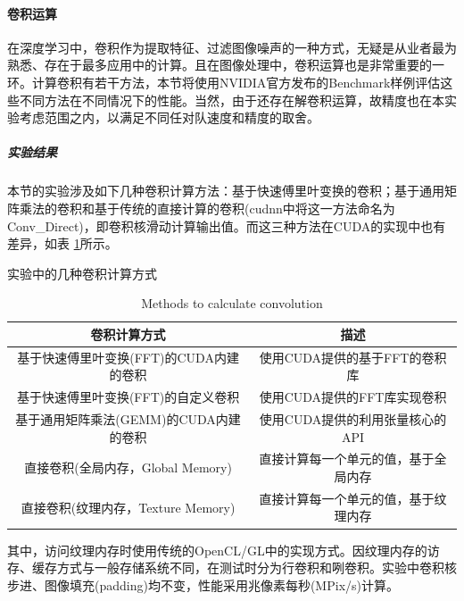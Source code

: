 \paragraph{卷积运算}
\par 在深度学习中，卷积作为提取特征、过滤图像噪声的一种方式，无疑是从业者最为熟悉、存在于最多应用中的计算。且在图像处理中，卷积运算也是非常重要的一环。计算卷积有若干方法，本节将使用NVIDIA官方发布的Benchmark样例评估这些不同方法在不同情况下的性能。当然，由于还存在解卷积运算，故精度也在本实验考虑范围之内，以满足不同任对队速度和精度的取舍。
\subparagraph{实验结果}
\par 本节的实验涉及如下几种卷积计算方法：基于快速傅里叶变换的卷积；基于通用矩阵乘法的卷积和基于传统的直接计算的卷积(cudnn中将这一方法命名为Conv\_Direct)，即卷积核滑动计算输出值。而这三种方法在CUDA的实现中也有差异，如表 \ref{table-CONV}所示。
\begin{table}
	\centering
	\renewcommand{\thetable}{\arabic{section}-\arabic{table} }
	\renewcommand{\tablename}{表}
	\caption{实验中的几种卷积计算方式}
	\addtocounter{table}{-1}
	\renewcommand{\thetable}{\arabic{section}-\arabic{table} }
	\renewcommand{\tablename}{Table}
	\caption{Methods to calculate convolution}
	\begin{tabular}{cc}
		\toprule
		卷积计算方式	&	描述\\
		\midrule
		基于快速傅里叶变换(FFT)的CUDA内建的卷积 & 使用CUDA提供的基于FFT的卷积库\\
		基于快速傅里叶变换(FFT)的自定义卷积 & 使用CUDA提供的FFT库实现卷积\\
		基于通用矩阵乘法(GEMM)的CUDA内建的卷积 & 使用CUDA提供的利用张量核心的API\\
		直接卷积(全局内存，Global Memory) & 直接计算每一个单元的值，基于全局内存\\
		直接卷积(纹理内存，Texture Memory) & 直接计算每一个单元的值，基于纹理内存\\
		\bottomrule
	\end{tabular} \label{table-CONV} 
\end{table}
\par 其中，访问纹理内存时使用传统的OpenCL/GL中的实现方式。因纹理内存的访存、缓存方式与一般存储系统不同，在测试时分为行卷积和咧卷积。实验中卷积核步进、图像填充(padding)均不变，性能采用兆像素每秒(MPix/s)计算。
